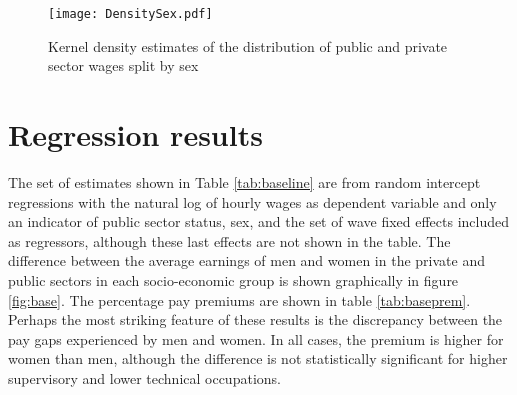 \documentclass[a4paper,11pt,titlepage]{article}
\begin{document}
\begin{figure}[tb]
    \centering
    \texttt{[image: DensitySex.pdf]}
    \caption{Kernel density estimates of the distribution of public and private sector wages split by sex\label{fig:densitysex}}
\end{figure}

\section{Regression results}
The set of estimates shown in Table \ref{tab:baseline} are from random intercept regressions with the natural log of hourly wages as dependent variable and only an indicator of public sector status, sex, and the set of wave fixed effects included as regressors, although these last effects are not shown in the table.  The difference between the average earnings of men and women in the private and public sectors in each socio-economic group is shown graphically in figure \ref{fig:base}. The percentage pay premiums are shown in table \ref{tab:baseprem}.  Perhaps the most striking feature of these results is the discrepancy between the pay gaps experienced by men and women.  In all cases, the premium is higher for women than men, although the difference is not statistically significant for higher supervisory and lower technical occupations.
\end{document}
